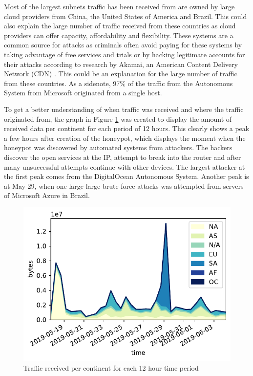 Most of the largest subnets traffic has been received from are owned by large cloud providers from China, the United States of America and Brazil. This could also explain the large number of traffic received from these countries as cloud providers can offer capacity, affordability and flexibility. These systems are a common source for attacks as criminals often avoid paying for these systems by taking advantage of free services and trials or by hacking legitimate accounts for their attacks according to research by Akamai, an American Content Delivery Network (CDN) \cite{DDOSCSP:AKAMAI:2019}. This could be an explanation for the large number of traffic from these countries. As a sidenote, 97\% of the traffic from the Autonomous System from Microsoft originated from a single host.

To get a better understanding of when traffic was received and where the traffic originated from, the graph in Figure \ref{fig:data_time_continent} was created to display the amount of received data per continent for each period of 12 hours. This clearly shows a peak a few hours after creation of the honeypot, which displays the moment when the honeypot was discovered by automated systems from attackers. The hackers discover the open services at the IP, attempt to break into the router and after many unsuccessful attempts continue with other devices. The largest attacker at the first peak comes from the DigitalOcean Autonomous System. Another peak is at May 29, when one large large brute-force attacks was attempted from servers of Microsoft Azure in Brazil.

\begin{figure}[ht]
    \includegraphics[width=\linewidth]{images/data_time_continent.pdf}
    \caption{Traffic received per continent for each 12 hour time period}
    \label{fig:data_time_continent}
\end{figure}

